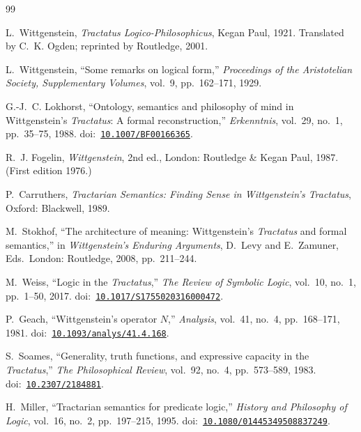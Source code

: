 \documentclass[10pt, letterpaper]{article}
\theoremstyle{definition}
\theoremstyle{remark}
\begin{document}
\begin{thebibliography}{99}

L.~Wittgenstein,
\emph{Tractatus Logico-Philosophicus},
Kegan Paul, 1921.
Translated by C.~K. Ogden; reprinted by Routledge, 2001.

L.~Wittgenstein,
``Some remarks on logical form,''
\emph{Proceedings of the Aristotelian Society, Supplementary
Volumes}, vol.~9, pp.~162--171, 1929.

G.-J.~C. Lokhorst,
``Ontology, semantics and philosophy of mind in Wittgenstein's
\emph{Tractatus}: A formal reconstruction,''
\emph{Erkenntnis}, vol.~29, no.~1, pp.~35--75, 1988.
\newline doi:~\href{https://doi.org/10.1007/BF00166365}{\texttt{10.1007/BF00166365}}.

R.~J. Fogelin,
\emph{Wittgenstein}, 2nd ed.,
London: Routledge \& Kegan Paul, 1987.
(First edition 1976.)

P.~Carruthers,
\emph{Tractarian Semantics: Finding Sense in Wittgenstein's
\emph{Tractatus}},
Oxford: Blackwell, 1989.

M.~Stokhof,
``The architecture of meaning: Wittgenstein's \emph{Tractatus} and
formal semantics,''
in \emph{Wittgenstein's Enduring Arguments},
D.~Levy and E.~Zamuner, Eds.\
London: Routledge, 2008, pp.~211--244.

M.~Weiss,
``Logic in the \emph{Tractatus},''
\emph{The Review of Symbolic Logic}, vol.~10, no.~1,
pp.~1--50, 2017.
\newline doi:~\href{https://doi.org/10.1017/S1755020316000472}{\texttt{10.1017/S1755020316000472}}.

P.~Geach,
``Wittgenstein's operator $N$,''
\emph{Analysis}, vol.~41, no.~4, pp.~168--171, 1981.
\newline doi:~\href{https://doi.org/10.1093/analys/41.4.168}{\texttt{10.1093/analys/41.4.168}}.

S.~Soames,
``Generality, truth functions, and expressive capacity in the
\emph{Tractatus},''
\emph{The Philosophical Review}, vol.~92, no.~4, pp.~573--589, 1983.
\newline doi:~\href{https://doi.org/10.2307/2184881}{\texttt{10.2307/2184881}}.

H.~Miller,
``Tractarian semantics for predicate logic,''
\emph{History and Philosophy of Logic}, vol.~16, no.~2,
pp.~197--215, 1995.
\newline doi:~\href{https://doi.org/10.1080/01445349508837249}{\texttt{10.1080/01445349508837249}}.


\end{thebibliography}
\end{document}
